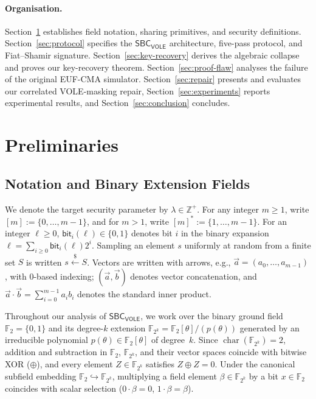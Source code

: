 \documentclass[11pt,a4paper]{article}
\theoremstyle{definition}
\theoremstyle{remark}
\newcommand{\Ftwo}{\mathbb{F}_2}
\newcommand{\Ftwok}{\mathbb{F}_{2^k}}
\newcommand{\SBCVOLE}{\mathsf{SBC}_{\mathsf{VOLE}}}
\begin{document}
\paragraph{Organisation.}
Section~\ref{sec:prelim} establishes field notation, sharing primitives, and security definitions. Section~\ref{sec:protocol} specifies the $\SBCVOLE$ architecture, five-pass protocol, and Fiat--Shamir signature. Section~\ref{sec:key-recovery} derives the algebraic collapse and proves our key-recovery theorem. Section~\ref{sec:proof-flaw} analyses the failure of the original EUF-CMA simulator. Section~\ref{sec:repair} presents and evaluates our correlated VOLE-masking repair, Section~\ref{sec:experiments} reports experimental results, and Section~\ref{sec:conclusion} concludes.

\section{Preliminaries}
\label{sec:prelim}

\subsection{Notation and Binary Extension Fields}
\label{subsec:prelim-notation}
We denote the target security parameter by $\lambda \in \mathbb{Z}^+$. For any integer $m \ge 1$, write $[m] := \{0, \dots, m - 1\}$, and for $m > 1$, write $[m]^* := \{1, \dots, m - 1\}$. For an integer $\ell \ge 0$, $\mathsf{bit}_i(\ell) \in \{0, 1\}$ denotes bit $i$ in the binary expansion $\ell = \sum_{i \ge 0} \mathsf{bit}_i(\ell) 2^i$. Sampling an element $s$ uniformly at random from a finite set $S$ is written $s \xleftarrow{\$} S$. Vectors are written with arrows, e.g., $\vec{a} = (a_0, \dots, a_{m-1})$, with $0$-based indexing; $(\vec{a}, \vec{b})$ denotes vector concatenation, and $\vec{a} \cdot \vec{b} = \sum_{i=0}^{m-1} a_i b_i$ denotes the standard inner product.

Throughout our analysis of $\SBCVOLE$, we work over the binary ground field $\Ftwo = \{0, 1\}$ and its degree-$k$ extension $\Ftwok = \Ftwo[\theta] / (p(\theta))$ generated by an irreducible polynomial $p(\theta) \in \Ftwo[\theta]$ of degree~$k$. Since $\operatorname{char}(\Ftwok) = 2$, addition and subtraction in $\Ftwo$, $\Ftwok$, and their vector spaces coincide with bitwise XOR ($\oplus$), and every element $Z \in \Ftwok$ satisfies $Z \oplus Z = 0$. Under the canonical subfield embedding $\Ftwo \hookrightarrow \Ftwok$, multiplying a field element $\beta \in \Ftwok$ by a bit $x \in \Ftwo$ coincides with scalar selection ($0 \cdot \beta = 0$, $1 \cdot \beta = \beta$).
\end{document}
